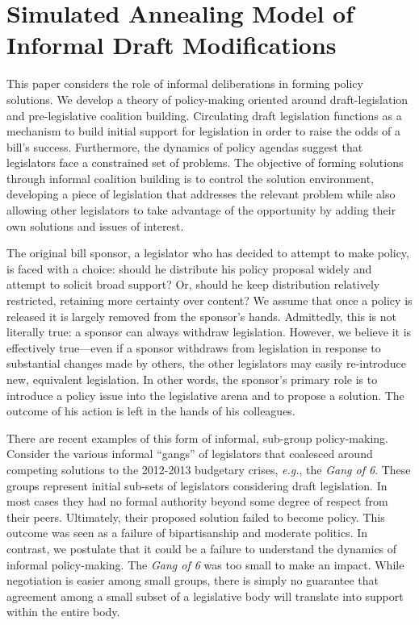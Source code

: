 \documentclass[pdftex,12pt]{llncs}
\begin{document}
\section{Simulated Annealing Model of Informal Draft Modifications}
This paper considers the role of informal deliberations in forming policy solutions.
We develop a theory of policy-making oriented around draft-legislation and pre-legislative coalition building.
Circulating draft legislation functions as a mechanism to build initial support for legislation in order to raise the odds of a bill's success. 
Furthermore, the dynamics of policy agendas suggest that legislators face a constrained set of problems. 
The objective of forming solutions through informal coalition building is to control the solution environment, developing a piece of legislation that addresses the relevant problem while also allowing other legislators to take advantage of the opportunity by adding their own solutions and issues of interest. 

The original bill sponsor, a legislator who has decided to attempt to make policy, is faced with a choice: should he distribute his policy proposal widely and attempt to solicit broad support? 
Or, should he keep distribution relatively restricted, retaining more certainty over content? 
We assume that once a policy is released it is largely removed from the sponsor's hands. 
Admittedly, this is not literally true: a sponsor can always withdraw legislation. 
However, we believe it is effectively true---even if a sponsor withdraws from legislation in response to substantial changes made by others, the other legislators may easily re-introduce new, equivalent legislation. 
In other words, the sponsor's primary role is to introduce a policy issue into the legislative arena and to propose a solution. 
The outcome of his action is left in the hands of his colleagues. 

There are recent examples of this form of informal, sub-group policy-making. 
Consider the various informal ``gangs'' of legislators that coalesced around competing solutions to the 2012-2013 budgetary crises, \textit{e.g.}, the \textit{Gang of 6}. 
These groups represent initial sub-sets of legislators considering draft legislation. 
In most cases they had no formal authority beyond some degree of respect from their peers. 
Ultimately, their proposed solution failed to become policy. 
This outcome was seen as a failure of bipartisanship and moderate politics. 
In contrast, we postulate that it could be a failure to understand the dynamics of informal policy-making. 
The \textit{Gang of 6} was too small to make an impact. 
While negotiation is easier among small groups, there is simply no guarantee that agreement among a small subset of a legislative body will translate into support within the entire body.
\end{document}
